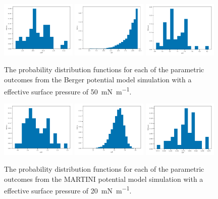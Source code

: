 \documentclass[amsmath,amssymb,superscriptaddress]{revtex4-1}
\begin{document}
%
%
\begin{figure}
 \centering
 \includegraphics[width=0.32\textwidth]{berger_50_dh}
 \includegraphics[width=0.32\textwidth]{berger_50_tt}
 \includegraphics[width=0.32\textwidth]{berger_50_wph}
 \caption{The probability distribution functions for each of the parametric outcomes from the Berger potential model simulation with a effective surface pressure of \SI{50}{\milli\newton\per\meter}.}
 \label{fig:be50}
\end{figure}
%
%
\begin{figure}
 \centering
 \includegraphics[width=0.32\textwidth]{martini_20_dh}
 \includegraphics[width=0.32\textwidth]{martini_20_tt}
 \includegraphics[width=0.32\textwidth]{martini_20_wph}
 \caption{The probability distribution functions for each of the parametric outcomes from the MARTINI potential model simulation with a effective surface pressure of \SI{20}{\milli\newton\per\meter}.}
 \label{fig:ma20}
\end{figure}
\end{document}
